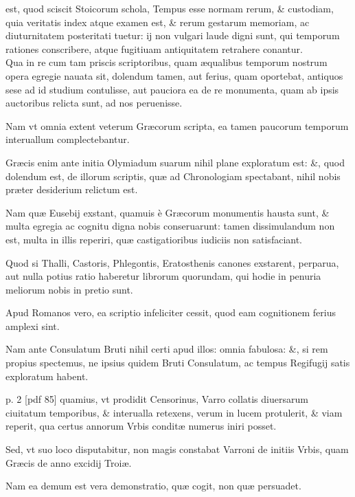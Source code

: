 \normalsize
\setcounter{parcount}{0}
\begin{parnumbers}
 est, quod sciscit Stoicorum
schola, Tempus esse normam rerum, \&
custodiam, quia veritatis index atque examen
est, \& rerum gestarum memoriam, ac
diuturnitatem posteritati tuetur: ij non vulgari
laude digni sunt, qui temporum rationes
conscribere, atque fugitiuam antiquitatem
retrahere conantur.
\\ \p
Qua in re cum
tam priscis scriptoribus, quam æqualibus
temporum nostrum opera egregie nauata sit, dolendum tamen, aut
ferius, quam oportebat, antiquos sese ad id studium contulisse, aut pauciora
ea de re monumenta, quam ab ipsis auctoribus relicta sunt, ad
nos peruenisse.

Nam vt omnia extent veterum Græcorum scripta, ea
tamen paucorum temporum interuallum complectebantur.

Græcis
enim ante initia Olymiadum suarum nihil plane exploratum est: \&,
quod dolendum est, de illorum scriptis, quæ ad Chronologiam spectabant,
nihil nobis præter desiderium relictum est.

Nam quæ Eusebij exstant,
quamuis è Græcorum monumentis hausta sunt, \& multa egregia
ac cognitu digna nobis conseruarunt: tamen dissimulandum non est,
multa in illis reperiri, quæ castigatioribus iudiciis non satisfaciant.

 Quod si Thalli, Castoris, Phlegontis,
 Eratosthenis canones exstarent,
perparua, aut nulla potius ratio haberetur librorum quorundam, qui
hodie in penuria meliorum nobis in pretio sunt.

Apud Romanos vero,
ea scriptio infeliciter cessit, quod eam cognitionem ferius amplexi sint.

Nam ante Consulatum Bruti nihil certi apud illos: omnia fabulosa: \&,
si rem propius spectemus, ne ipsius quidem Bruti Consulatum, ac tempus
Regifugij satis exploratum habent.

\clearpage
p. 2 [pdf 85]
quamius, vt prodidit Censorinus,
Varro collatis diuersarum ciuitatum temporibus, \& interualla retexens,
verum in lucem protulerit, \& viam reperit, qua certus
annorum Vrbis conditæ numerus iniri posset.

Sed, vt suo loco disputabitur,
non magis constabat Varroni de initiis Vrbis, quam Græcis de
anno excidij Troiæ.

Nam ea demum est vera demonstratio, quæ cogit,
non quæ persuadet.


\end{parnumbers}
